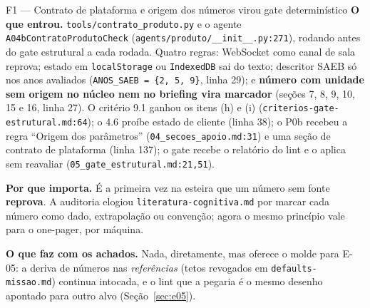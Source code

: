 \documentclass[11pt,a4paper]{article}
\begin{document}
\begin{creditobox}{F1 --- Contrato de plataforma e origem dos números virou gate determinístico}
\textbf{O que entrou.} \texttt{tools/contrato\_produto.py} e o agente \texttt{A04bContratoProdutoCheck}
(\texttt{agents/produto/\_\_init\_\_.py:271}), rodando antes do gate estrutural a cada rodada. Quatro
regras: WebSocket como canal de sala reprova; estado em \texttt{localStorage} ou \texttt{IndexedDB}
sai do texto; descritor SAEB só nos anos avaliados (\texttt{ANOS\_SAEB = \{2, 5, 9\}}, linha 29); e
\textbf{número com unidade sem origem no núcleo nem no briefing vira marcador} (seções 7, 8, 9, 10,
15 e 16, linha 27). O critério 9.1 ganhou os itens (h) e (i)
(\texttt{criterios-gate-estrutural.md:64}); o 4.6 proíbe estado de cliente (linha 38); o P0b recebeu a
regra ``Origem dos parâmetros'' (\texttt{04\_secoes\_apoio.md:31}) e uma seção de contrato de
plataforma (linha 137); o gate recebe o relatório do lint e o aplica sem reavaliar
(\texttt{05\_gate\_estrutural.md:21,51}).

\textbf{Por que importa.} É a primeira vez na esteira que um número sem fonte \textbf{reprova}. A
auditoria elogiou \texttt{literatura-cognitiva.md} por marcar cada número como dado, extrapolação ou
convenção; agora o mesmo princípio vale para o one-pager, por máquina.

\textbf{O que faz com os achados.} Nada, diretamente, mas oferece o molde para E-05: a deriva de
números nas \emph{referências} (tetos revogados em \texttt{defaults-missao.md}) continua intocada, e
o lint que a pegaria é o mesmo desenho apontado para outro alvo (Seção~\ref{sec:e05}).
\end{creditobox}
\end{document}
